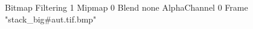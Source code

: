 {Bitmap
	{Filtering 1}
	{Mipmap 0}
	{Blend none}
	{AlphaChannel 0}
	{Frame "stack_big#aut.tif.bmp"}
}
